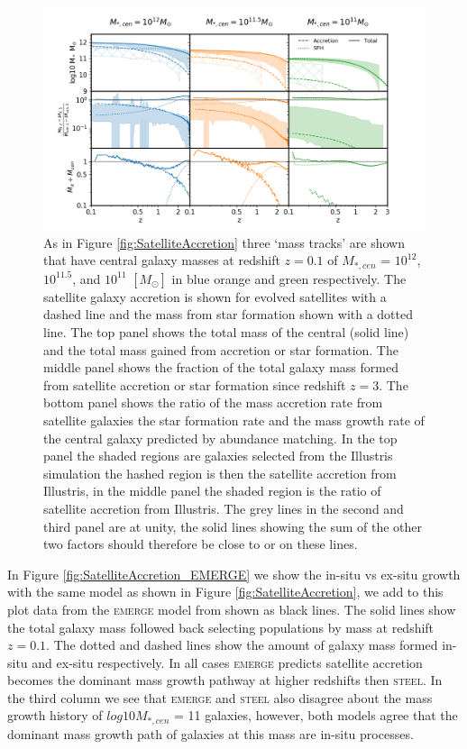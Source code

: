 \begin{figure}
	\centering
	\includegraphics[width = \linewidth]{Appendices/StellarMassAssembly/SatelliteAccretion_G19_ill.png}
    \caption{As in Figure \ref{fig:SatelliteAccretion} three `mass tracks' are shown that have central galaxy masses at redshift $z = 0.1$ of $M_{*,cen}$ = $10^{12}$, $10^{11.5}$, and $10^{11}$ $[M_{\odot}]$ in blue orange and green respectively. The satellite galaxy accretion is shown for evolved satellites with a dashed line and the mass from star formation shown with a dotted line. The top panel shows the total mass of the central (solid line) and the total mass gained from accretion or star formation. The middle panel shows the fraction of the total galaxy mass formed from satellite accretion or star formation since redshift $z=3$. The bottom panel shows the ratio of the mass accretion rate from satellite galaxies the star formation rate and the mass growth rate of the central galaxy predicted by abundance matching. In the top panel the shaded regions are galaxies selected from the Illustris simulation the hashed region is then the satellite accretion from Illustris, in the middle panel the shaded region is the ratio of satellite accretion from Illustris. The grey lines in the second and third panel are at unity, the solid lines showing the sum of the other two factors should therefore be close to or on these lines.}
	\label{fig:SatelliteAccretion_ill}
\end{figure}

In Figure \ref{fig:SatelliteAccretion_EMERGE} we show the in-situ vs ex-situ growth with the same model as shown in Figure \ref{fig:SatelliteAccretion}, we add to this plot data from the \textsc{emerge} model from \citet{Moster2018Emerge10} shown as black lines. The solid lines show the total galaxy mass followed back selecting populations by mass at redshift $z = 0.1$. The dotted and dashed lines show the amount of galaxy mass formed in-situ and ex-situ respectively. In all cases \textsc{emerge} predicts satellite accretion becomes the dominant mass growth pathway at higher redshifts then \textsc{steel}. In the third column we see that \textsc{emerge} and \textsc{steel} also disagree about the mass growth history of $log 10 M_{*,cen}$ = 11 galaxies, however, both models agree that the dominant mass growth path of galaxies at this mass are in-situ processes.

